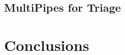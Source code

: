 \documentclass{acm_proc_article-sp}
\begin{document}


\subsection{MultiPipes for Triage}



\section{Conclusions}





\balancecolumns
\end{document}
